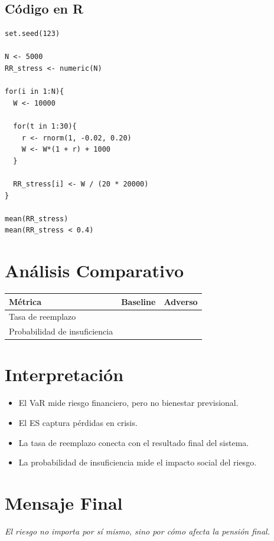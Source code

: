 \documentclass[12pt]{article}
\begin{document}
\subsection{Código en R}
\begin{verbatim}
set.seed(123)

N <- 5000
RR_stress <- numeric(N)

for(i in 1:N){
  W <- 10000
  
  for(t in 1:30){
    r <- rnorm(1, -0.02, 0.20)
    W <- W*(1 + r) + 1000
  }
  
  RR_stress[i] <- W / (20 * 20000)
}

mean(RR_stress)
mean(RR_stress < 0.4)
\end{verbatim}

\section{Análisis Comparativo}

\begin{center}
\begin{tabular}{lcc}
\toprule
Métrica & Baseline & Adverso \\
\midrule
Tasa de reemplazo &  &  \\
Probabilidad de insuficiencia &  &  \\
\bottomrule
\end{tabular}
\end{center}

\section{Interpretación}

\begin{itemize}
\item El VaR mide riesgo financiero, pero no bienestar previsional.
\item El ES captura pérdidas en crisis.
\item La tasa de reemplazo conecta con el resultado final del sistema.
\item La probabilidad de insuficiencia mide el impacto social del riesgo.
\end{itemize}

\section{Mensaje Final}

\begin{center}
\textit{El riesgo no importa por sí mismo, sino por cómo afecta la pensión final.}
\end{center}
\end{document}
